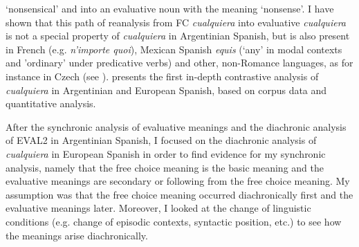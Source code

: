 ‘nonsensical’ and into an evaluative noun with the meaning ‘nonsense’. I have shown that this path of reanalysis from FC \textit{cualquiera} into evaluative \textit{cualquiera} is not a special property of \textit{cualquiera} in Argentinian Spanish, but is also present in French (e.g. \textit{n’importe quoi}), Mexican Spanish \textit{equis} (‘any’ in modal contexts and ’ordinary’ under predicative verbs) \citep{Kellert2020semantic} and other, non-Romance languages, as for instance in Czech (see \citealt{Simik2008}).  presents the first in-depth contrastive analysis of \textit{cualquiera} in Argentinian and European Spanish, based on corpus data and quantitative analysis.

  After the synchronic analysis of evaluative meanings and the diachronic analysis of EVAL2 in Argentinian Spanish, I focused on the diachronic analysis of \textit{cualquiera} in European Spanish in order to find evidence for my synchronic analysis, namely that the free choice meaning is the basic meaning and the evaluative meanings are secondary or following from the free choice meaning. My assumption was that the free choice meaning occurred diachronically first and the evaluative meanings later. Moreover, I looked at the change of linguistic conditions (e.g. change of episodic contexts, syntactic position, etc.) to see how the meanings arise diachronically.

